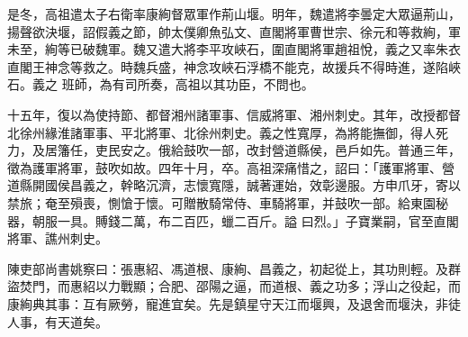 \begin{pinyinscope}
 是冬，高祖遣太子右衛率康絢督眾軍作荊山堰。明年，魏遣將李曇定大眾逼荊山，揚聲欲決堰，詔假義之節，帥太僕卿魚弘文、直閣將軍曹世宗、徐元和等救絢，軍未至，絢等已破魏軍。魏又遣大將李平攻峽石，圍直閣將軍趙祖悅，義之又率朱衣直閣王神念等救之。時魏兵盛，神念攻峽石浮橋不能克，故援兵不得時進，遂陷峽石。義之
 班師，為有司所奏，高祖以其功臣，不問也。



 十五年，復以為使持節、都督湘州諸軍事、信威將軍、湘州刺史。其年，改授都督北徐州緣淮諸軍事、平北將軍、北徐州刺史。義之性寬厚，為將能撫御，得人死力，及居籓任，吏民安之。俄給鼓吹一部，改封營道縣侯，邑戶如先。普通三年，徵為護軍將軍，鼓吹如故。四年十月，卒。高祖深痛惜之，詔曰：「護軍將軍、營道縣開國侯昌義之，幹略沉濟，志懷寬隱，誠著運始，效彰邊服。方申爪牙，寄以禁旅；奄至殞喪，惻愴于懷。可贈散騎常侍、車騎將軍，并鼓吹一部。給東園秘器，朝服一具。賻錢二萬，布二百匹，蠟二百斤。謚
 曰烈。」子寶業嗣，官至直閣將軍、譙州刺史。



 陳吏部尚書姚察曰：張惠紹、馮道根、康絢、昌義之，初起從上，其功則輕。及群盜焚門，而惠紹以力戰顯；合肥、邵陽之逼，而道根、義之功多；浮山之役起，而康絢典其事：互有厥勞，寵進宜矣。先是鎮星守天江而堰興，及退舍而堰決，非徒人事，有天道矣。



\end{pinyinscope}